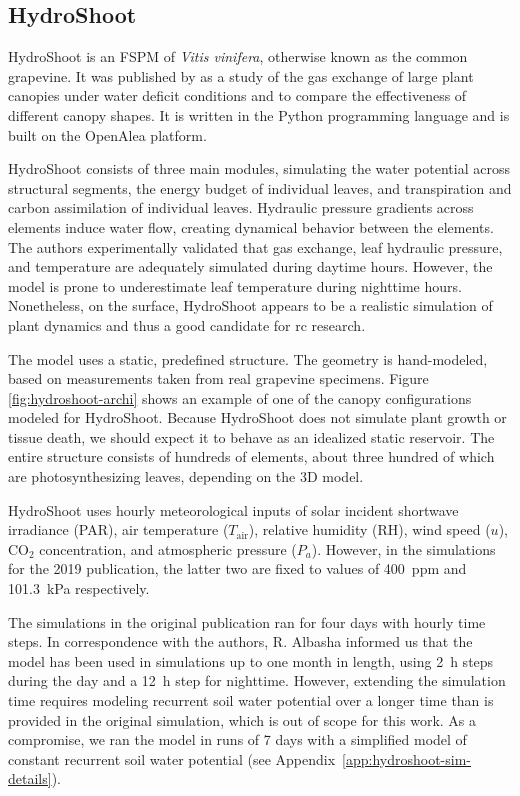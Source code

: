
\subsection{HydroShoot}

HydroShoot is an FSPM of \textit{Vitis vinifera}, otherwise known as the common grapevine.
It was published by \citet{albasha_hydroshoot_2019} as a study of the gas exchange of large plant canopies under water deficit conditions and to compare the effectiveness of different canopy shapes.
It is written in the Python programming language and is built on the OpenAlea platform.
 

HydroShoot consists of three main modules, simulating the water potential across structural segments, the energy budget of individual leaves, and transpiration and carbon assimilation of individual leaves.
Hydraulic pressure gradients across elements induce water flow, creating dynamical behavior between the elements.
The authors experimentally validated that gas exchange, leaf hydraulic pressure, and temperature are adequately simulated during daytime hours.
However, the model is prone to underestimate leaf temperature during nighttime hours.
Nonetheless, on the surface, HydroShoot appears to be a realistic simulation of plant dynamics and thus a good candidate for \acrshort{rc} research.


The model uses a static, predefined structure. 
The geometry is hand-modeled, based on measurements taken from real grapevine specimens.
Figure \ref{fig:hydroshoot-archi} shows an example of one of the canopy configurations modeled for HydroShoot.
Because HydroShoot does not simulate plant growth or tissue death, we should expect it to behave as an idealized static reservoir.
The entire structure consists of hundreds of elements, about three hundred of which are photosynthesizing leaves, depending on the 3D model.


HydroShoot uses hourly meteorological inputs of solar incident shortwave irradiance (PAR), air temperature ($T_{\text{air}}$), relative humidity (RH), wind speed ($u$), CO$_2$ concentration, and atmospheric pressure ($P_a$).
However, in the simulations for the 2019 publication, the latter two are fixed to values of \SI{400}{ppm} and \SI{101.3}{kPa} respectively.


The simulations in the original publication ran for four days with hourly time steps.
In correspondence with the authors, R. Albasha informed us that the model has been used in simulations up to one month in length, using \SI{2}{h} steps during the day and a \SI{12}{h} step for nighttime.
However, extending the simulation time requires modeling recurrent soil water potential over a longer time than is provided in the original simulation, which is out of scope for this work.
As a compromise, we ran the model in runs of 7 days with a simplified model of constant recurrent soil water potential (see \mbox{Appendix \ref{app:hydroshoot-sim-details}}).


